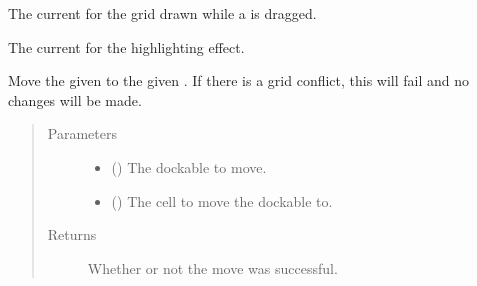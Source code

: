 \documentclass[letterpaper,10pt,english]{sphinxmanual}
\begin{document}
\begin{fulllineitems}

\begin{fulllineitems}
\label{\detokenize{api:gui.core.Grid.grid_visual}}
The current  for the grid drawn while a  is dragged.

\end{fulllineitems}


\begin{fulllineitems}
\label{\detokenize{api:gui.core.Grid.highlight_visual}}
The current  for the highlighting effect.

\end{fulllineitems}


\begin{fulllineitems}
\label{\detokenize{api:gui.core.Grid.move_dockable}}
Move the given   to the given  . If there is a grid conflict, this
will fail and no changes will be made.
\begin{quote}\begin{description}
\item[{Parameters}] \leavevmode\begin{itemize}
\item {} 
 () \textendash{} The dockable to move.

\item {} 
 ({\hyperref[\detokenize{api:gui.core.Cell}]{}}) \textendash{} The cell to move the dockable to.

\end{itemize}

\item[{Returns}] \leavevmode
Whether or not the move was successful.


\end{description}
\end{quote}
\end{fulllineitems}
\end{fulllineitems}
\end{document}
